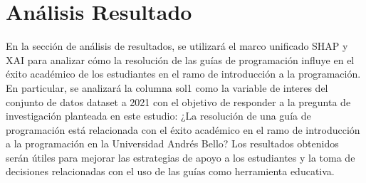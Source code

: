 \hypertarget{analisis_resultado}{%
    \section{Análisis Resultado}\label{Análisis Resultado}}

En la sección de análisis de resultados, se utilizará el marco unificado SHAP y XAI para analizar cómo la resolución de las guías de programación influye en el éxito académico de los estudiantes en el ramo de introducción a la programación. En particular, se analizará la columna sol1 como la variable de interes del conjunto de datos dataset a 2021 con el objetivo de responder a la pregunta de investigación planteada en este estudio: ¿La resolución de una guía de programación está relacionada con el éxito académico en el ramo de introducción a la programación en la Universidad Andrés Bello? Los resultados obtenidos serán útiles para mejorar las estrategias de apoyo a los estudiantes y la toma de decisiones relacionadas con el uso de las guías como herramienta educativa.






